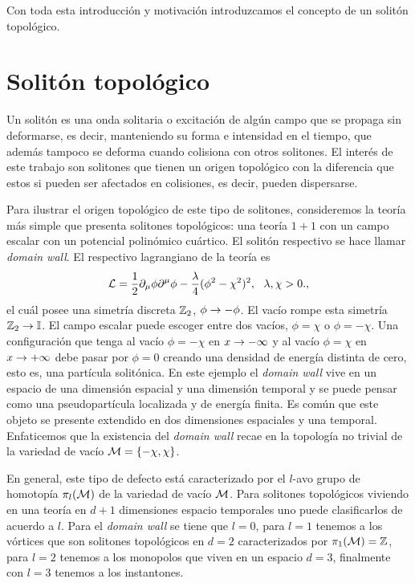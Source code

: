 Con toda esta introducción y motivación introduzcamos el concepto de un solitón topológico.

\section{Solitón topológico}

Un solitón es una onda solitaria o excitación de algún campo que se propaga sin deformarse, es decir, manteniendo su forma e intensidad en el tiempo, que además tampoco se deforma cuando colisiona con otros solitones. El interés de este trabajo son solitones que tienen un origen topológico con la diferencia que estos si pueden ser afectados en colisiones, es decir, pueden dispersarse.

Para ilustrar el origen topológico de este tipo de solitones, consideremos la teoría más simple que presenta solitones topológicos: una teoría $1+1$ con un campo escalar con un potencial polinómico cuártico. El solitón respectivo se hace llamar \emph{domain wall}. El respectivo lagrangiano de la teoría es
\begin{align}
	\mc L = \f 12\pr_\mu\phi\pr^\mu\phi-\f{\lambda}4(\phi^2-\chi^2)^2, \ \ \lambda,\chi>0.,
\end{align}
el cuál posee una simetría discreta $\mathbb{Z}_2$, $\phi\rightarrow-\phi$. El vacío rompe esta simetría $\mathbb{Z}_2\rightarrow\mathbb{I}$. El campo escalar puede escoger entre dos vacíos, $\phi=\chi$ o $\phi=-\chi$. Una configuración que tenga al vacío $\phi=-\chi$ en $x\rightarrow-\infty$ y al vacío $\phi=\chi$ en $x\rightarrow+\infty$ debe pasar por $\phi=0$ creando una densidad de energía distinta de cero, esto es, una partícula solitónica. En este ejemplo el \emph{domain wall} vive en un espacio de una dimensión espacial y una dimensión temporal y se puede pensar como una pseudopartícula localizada y de energía finita. Es común que este objeto se presente extendido en dos dimensiones espaciales y una temporal. Enfaticemos que la existencia del \emph{domain wall} recae en la topología no trivial de la variedad de vacío $\mathcal{M}=\{-\chi,\chi\}$.

En general, este tipo de defecto está caracterizado por el $l$-avo grupo de homotopía $\pi_l(\mathcal{M})$ de la variedad de vacío $\mathcal{M}$. Para solitones topológicos viviendo en una teoría en $d+1$ dimensiones espacio temporales uno puede clasificarlos de acuerdo a $l$. Para el \emph{domain wall} se tiene que $l=0$, para $l=1$ tenemos a los vórtices que son solitones topológicos en $d=2$ caracterizados por $\pi_1(\mathcal{M})=\mathbb{Z}$, para $l=2$ tenemos a los monopolos que viven en un espacio $d=3$, finalmente con $l=3$ tenemos a los instantones.